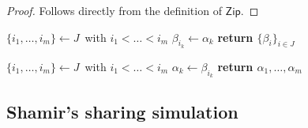 \documentclass{iacrtrans}
\begin{document}
\begin{proof}
Follows directly from the definition of $\mathsf{Zip}$.
\end{proof}

\begin{minipage}[t]{0.46\textwidth}
\vspace{0pt}
\begin{algorithm}[H]
    \centering
    \caption{$\mathsf{Zip}\hspace{1pt}
    (\alpha_1, \dots, \alpha_m;
    \hspace{2pt} J\hspace{1pt})$}\label{alg_zip}
    \begin{algorithmic}
    	\vspace{2pt}
    	\State
			$\{i_1, \dots, i_m\} \leftarrow J$\ with
			$i_1 < \dots < i_m$\vspace{3pt}
    	\vspace{2pt}
			\State
    			$\beta_{i_k} \leftarrow \alpha_k$\vspace{2pt}
		\EndFor
        \State \textbf{return $\{\beta_i\}_{i \in J}$}
    \end{algorithmic}
\end{algorithm}
\vspace{0pt}
\end{minipage}
\hfill
\begin{minipage}[t]{0.46\textwidth}
\vspace{0pt}
\begin{algorithm}[H]
    \centering
    \caption{$\mathsf{Zip}^{-1}\hspace{1pt}
    (\hspace{1pt}\{\beta_i\}_{i \in J})$}\label{alg_zip_inv}
    \begin{algorithmic}
    	\vspace{2pt}
    	\State
			$\{i_1, \dots, i_m\} \leftarrow J$\ with
			$i_1 < \dots < i_m$\vspace{3pt}
    	\vspace{2pt}
			\State
    			$\alpha_k \leftarrow \beta_{i_k}$\vspace{2pt}
		\EndFor
        \State \textbf{return $\alpha_1, \dots, \alpha_m$}
    \end{algorithmic}
\end{algorithm}\vspace{0pt}
\vspace{0pt}
\end{minipage}

\subsection{Shamir's sharing simulation}\label{section_shamir_sharing_simulation}
\end{document}
